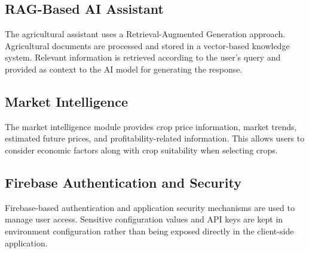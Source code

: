 \subsection{RAG-Based AI Assistant}

The agricultural assistant uses a Retrieval-Augmented Generation approach. Agricultural documents are processed and stored in a vector-based knowledge system. Relevant information is retrieved according to the user's query and provided as context to the AI model for generating the response.

\subsection{Market Intelligence}

The market intelligence module provides crop price information, market trends, estimated future prices, and profitability-related information. This allows users to consider economic factors along with crop suitability when selecting crops.

\subsection{Firebase Authentication and Security}

Firebase-based authentication and application security mechanisms are used to manage user access. Sensitive configuration values and API keys are kept in environment configuration rather than being exposed directly in the client-side application.
